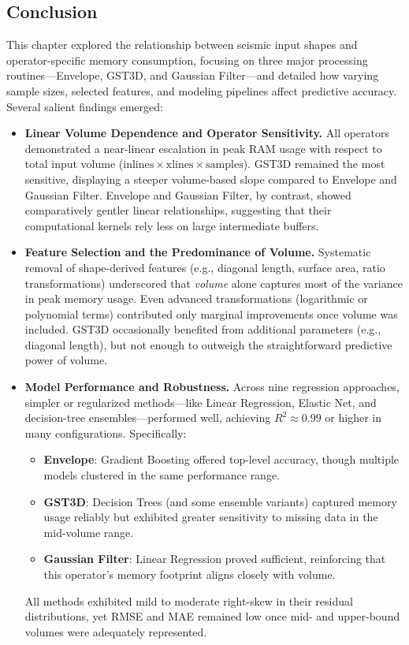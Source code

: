 \subsection{Conclusion}
\label{subsec:pmc-conclusion}

This chapter explored the relationship between seismic input shapes and operator-specific memory consumption, focusing on three major processing routines—Envelope, \ac{GST3D}, and Gaussian Filter—and detailed how varying sample sizes, selected features, and modeling pipelines affect predictive accuracy.
Several salient findings emerged:

\begin{itemize}
    \item \textbf{Linear Volume Dependence and Operator Sensitivity.}
    All operators demonstrated a near-linear escalation in peak \ac{RAM} usage with respect to total input volume (\( \text{inlines} \times \text{xlines} \times \text{samples} \)).
    \ac{GST3D} remained the most sensitive, displaying a steeper volume-based slope compared to Envelope and Gaussian Filter.
    Envelope and Gaussian Filter, by contrast, showed comparatively gentler linear relationships, suggesting that their computational kernels rely less on large intermediate buffers.

    \item \textbf{Feature Selection and the Predominance of Volume.}
    Systematic removal of shape-derived features (e.g., diagonal length, surface area, ratio transformations) underscored that \emph{volume} alone captures most of the variance in peak memory usage.
    Even advanced transformations (logarithmic or polynomial terms) contributed only marginal improvements once volume was included.
    \ac{GST3D} occasionally benefited from additional parameters (e.g., diagonal length), but not enough to outweigh the straightforward predictive power of volume.

    \item \textbf{Model Performance and Robustness.}
    Across nine regression approaches, simpler or regularized methods—like \ac{Linear Regression}, Elastic Net, and decision-tree ensembles—performed well, achieving \(R^2 \approx 0.99\) or higher in many configurations.
    Specifically:
    \begin{itemize}
        \item \textbf{Envelope}: Gradient Boosting offered top-level accuracy, though multiple models clustered in the same performance range.
        \item \textbf{\ac{GST3D}}: Decision Trees (and some ensemble variants) captured memory usage reliably but exhibited greater sensitivity to missing data in the mid-volume range.
        \item \textbf{Gaussian Filter}: \ac{Linear Regression} proved sufficient, reinforcing that this operator’s memory footprint aligns closely with volume.
    \end{itemize}
    All methods exhibited mild to moderate right-skew in their residual distributions, yet \ac{RMSE} and \ac{MAE} remained low once mid- and upper-bound volumes were adequately represented.


\end{itemize}
